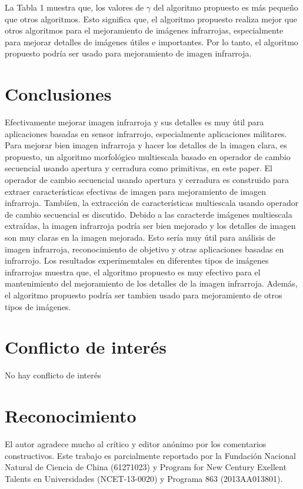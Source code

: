 \documentclass[a4paper, 11 pt, conference]{ieeeconf}      %
\begin{document}
La Tabla 1 muestra que, los valores de $\gamma$ del algoritmo propuesto es m\'as pequeño que otros algoritmos. Esto significa que, el algoritmo propuesto realiza mejor que otros algoritmos para el mejoramiento de im\'agenes infrarrojas, especialmente para mejorar detalles de im\'agenes \'utiles e importantes. Por lo tanto, el algoritmo propuesto podr\'ia ser usado para mejoramiento de imagen infrarroja.

\section{Conclusiones}

Efectivamente mejorar imagen infrarroja y sus detalles es muy \'util para aplicaciones basadas en sensor infrarrojo, especialmente aplicaciones militares. Para mejorar bien imagen infrarroja y hacer los detalles de la imagen clara, es propuesto, un algoritmo morfol\'ogico multiescala basado en operador de cambio secuencial usando apertura y cerradura como primitivas, en este paper. El operador de cambio secuencial usando apertura y cerradura es construido para extraer caracter\'isticas efectivas de imagen para mejoramiento de imagen infrarroja. Tambi\'ien, la extracci\'on de caracter\'isticas multiescala usando operador de cambio secuencial es discutido. Debido a las caracter\isticas de im\'agenes multiescala extra\'idas, la imagen infrarroja podr\'ia ser bien mejorado y los detalles de imagen son muy claras en la imagen mejorada. Esto ser\'ia muy \'util para an\'alisis de imagen infrarroja, reconocimiento de objetivo y otras aplicaciones basadas en infrarrojo. Los resultados experimemtales en diferentes tipos de im\'agenes infrarrojas muestra que, el algoritmo propuesto es muy efectivo para el mantenimiento del mejoramiento de los detalles de la imagen infrarroja. Adem\'as, el algoritmo propuesto podr\'ia ser tambien usado para mejoramiento de otros tipos de im\'agenes.

\section*{\textbf{Conflicto de inter\'es}}

No hay conflicto de inter\'es

\section*{\textbf{Reconocimiento}}

El autor agradece mucho al cr\'itico y editor an\'onimo por los comentarios constructivos. Este trabajo es parcialmente reportado por la Fundaci\'on Nacional Natural de Ciencia de China (61271023) y Program for New Century Exellent Talents en Universidades (NCET-13-0020) y Programa 863 (2013AA013801).
\end{document}
